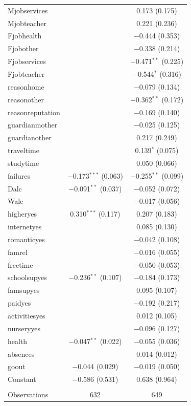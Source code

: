 \documentclass[a4paper,8pt,twocolumn,twoside,]{pinp}
\begin{document}
\begin{table}[!htbp]
\begin{tabular}{@{\extracolsep{1pt}}lcc}
  Mjobservices &  & 0.173 (0.175) \\ 
  Mjobteacher &  & 0.221 (0.236) \\ 
  Fjobhealth &  & $-$0.444 (0.353) \\ 
  Fjobother &  & $-$0.338 (0.214) \\ 
  Fjobservices &  & $-$0.471$^{**}$ (0.225) \\ 
  Fjobteacher &  & $-$0.544$^{*}$ (0.316) \\ 
  reasonhome &  & $-$0.079 (0.134) \\ 
  reasonother &  & $-$0.362$^{**}$ (0.172) \\ 
  reasonreputation &  & $-$0.169 (0.140) \\ 
  guardianmother &  & $-$0.025 (0.125) \\ 
  guardianother &  & 0.217 (0.249) \\ 
  traveltime &  & 0.139$^{*}$ (0.075) \\ 
  studytime &  & 0.050 (0.066) \\ 
  failures & $-$0.173$^{***}$ (0.063) & $-$0.255$^{**}$ (0.099) \\ 
  Dalc & $-$0.091$^{**}$ (0.037) & $-$0.052 (0.072) \\ 
  Walc &  & $-$0.017 (0.056) \\ 
  higheryes & 0.310$^{***}$ (0.117) & 0.207 (0.183) \\ 
  internetyes &  & 0.085 (0.130) \\ 
  romanticyes &  & $-$0.042 (0.108) \\ 
  famrel &  & $-$0.016 (0.055) \\ 
  freetime &  & $-$0.050 (0.053) \\ 
  schoolsupyes & $-$0.236$^{**}$ (0.107) & $-$0.184 (0.173) \\ 
  famsupyes &  & 0.095 (0.107) \\ 
  paidyes &  & $-$0.192 (0.217) \\ 
  activitiesyes &  & 0.012 (0.105) \\ 
  nurseryyes &  & $-$0.096 (0.127) \\ 
  health & $-$0.047$^{**}$ (0.022) & $-$0.055 (0.036) \\ 
  absences &  & 0.014 (0.012) \\ 
  goout & $-$0.044 (0.029) & $-$0.019 (0.050) \\ 
  Constant & $-$0.586 (0.531) & 0.638 (0.964) \\ 
 \hline \\[-1.8ex] 
Observations & 632 & 649 \\ 

\end{tabular}
\end{table}
\end{document}
